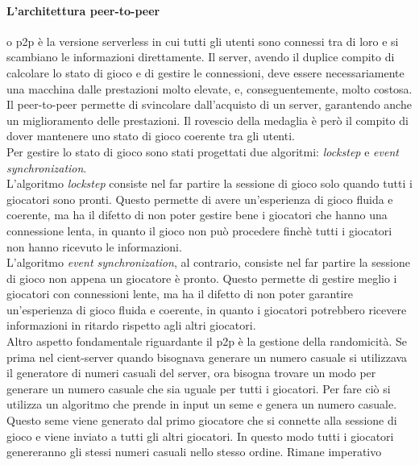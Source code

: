         \paragraph{L'architettura peer-to-peer} o p2p è la versione serverless in cui tutti gli utenti sono connessi tra di loro e si scambiano le 
            informazioni direttamente. Il server, avendo il duplice compito di calcolare lo stato di gioco e di gestire le connessioni, deve essere necessariamente una macchina 
            dalle prestazioni molto elevate, e, conseguentemente, molto costosa. Il peer-to-peer permette di svincolare dall'acquisto di un server, garantendo anche un miglioramento 
            delle prestazioni. Il rovescio della medaglia è però il compito di dover mantenere uno stato di gioco coerente tra gli utenti.\\
            Per gestire lo stato di gioco sono stati progettati due algoritmi: \textit{lockstep} e \textit{event synchronization}.\\
            L'algoritmo \textit{lockstep} consiste nel far partire la sessione di gioco solo quando tutti i giocatori sono pronti. Questo permette di avere un'esperienza di gioco
            fluida e coerente, ma ha il difetto di non poter gestire bene i giocatori che hanno una connessione lenta, in quanto il gioco non può procedere finchè tutti i giocatori
            non hanno ricevuto le informazioni.\\
            L'algoritmo \textit{event synchronization}, al contrario, consiste nel far partire la sessione di gioco non appena un giocatore è pronto. Questo permette di gestire meglio
            i giocatori con connessioni lente, ma ha il difetto di non poter garantire un'esperienza di gioco fluida e coerente, in quanto i giocatori potrebbero ricevere informazioni 
            in ritardo rispetto agli altri giocatori.\\
            Altro aspetto fondamentale riguardante il p2p è la gestione della randomicità. Se prima nel cient-server quando bisognava generare un numero casuale si utilizzava il
            generatore di numeri casuali del server, ora bisogna trovare un modo per generare un numero casuale che sia uguale per tutti i giocatori.
            Per fare ciò si utilizza un algoritmo che prende in input un seme e genera un numero casuale. Questo seme viene generato dal primo giocatore che si connette alla sessione
            di gioco e viene inviato a tutti gli altri giocatori. In questo modo tutti i giocatori genereranno gli stessi numeri casuali nello stesso ordine. Rimane imperativo 
